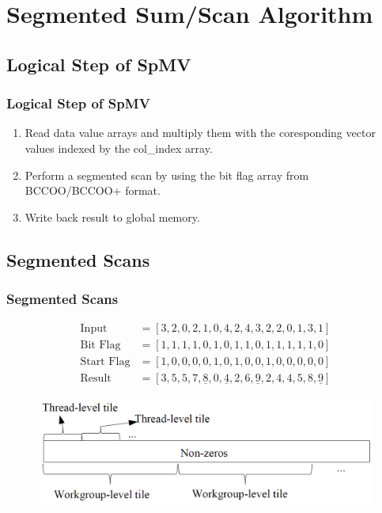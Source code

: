 \section{Segmented Sum/Scan Algorithm}

\subsection{Logical Step of SpMV}
\begin{frame}
	\frametitle{Logical Step of SpMV}
	\begin{enumerate}
		\item Read data value arrays and multiply them with the coresponding
			vector values indexed by the col\_index array.
		\item Perform a segmented scan by using the bit flag array from 
			BCCOO/BCCOO+ format.
		\item Write back result to global memory.
	\end{enumerate}
\end{frame}

\subsection{Segmented Scans}
\begin{frame}
	\frametitle{Segmented Scans}
	\begin{align*}
	\text{Input} 		&= [3, 2, 0, 2, 1, 0, 4, 2, 4, 3, 2, 2, 0, 1, 3, 1] \\
	\text{Bit Flag} 	&= [1, 1, 1, 1, 0, 1, 0, 1, 1, 0, 1, 1, 1, 1, 1, 0] \\ 
	\text{Start Flag} 	&= [1, 0, 0, 0, 0, 1, 0, 1, 0, 0, 1, 0, 0, 0, 0, 0] \\
	\text{Result}		&= [3, 5, 5, 7, \underline{8}, 0, \underline{4}, 2, 
		6, \underline{9}, 2, 4, 4, 5, 8, \underline{9}]
	\end{align*}
	\begin{figure}
		\includegraphics[scale=0.2]{figure/fig1-workload.png}
	\end{figure}
\end{frame}

